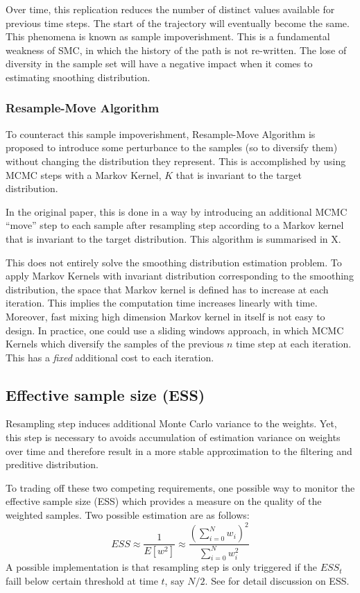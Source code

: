 Over time, this replication reduces the number of distinct values available for previous time steps. The start of the trajectory will eventually become the same. This phenomena is known as sample impoverishment. This is a fundamental weakness of SMC, in which the history of the path is not re-written. The lose of diversity in the sample set will have a negative impact when it comes to estimating snoothing distribution.

\subsubsection{Resample-Move Algorithm}
To counteract this sample impoverishment, Resample-Move Algorithm \cite{} is proposed to introduce some perturbance to the samples (so to diversify them) without changing the distribution they represent. This is accomplished by using MCMC steps with a Markov Kernel, $K$ that is invariant to the target distribution.

In the original paper, this is done in a way by introducing an additional MCMC ``move'' step to each sample after resampling step according to a Markov kernel that is invariant to the target distribution. This algorithm is summarised in X.

This does not entirely solve the smoothing distribution estimation problem. To apply Markov Kernels with invariant distribution corresponding to the smoothing distribution, the space that Markov kernel is defined has to increase at each iteration. This implies the computation time increases linearly with time. Moreover, fast mixing high dimension Markov kernel in itself is not easy to design. In practice, one could use a sliding windows approach, in which MCMC Kernels which diversify the samples of the previous $n$ time step at each iteration. This has a \emph{fixed} additional cost to each iteration.

\subsection{Effective sample size (ESS)}
Resampling step induces additional Monte Carlo variance to the weights. Yet, this step is necessary to avoids accumulation of estimation variance on weights over time and therefore result in a more stable approximation to the filtering and preditive distribution.

To trading off these two competing requirements, one possible way to monitor the effective sample size (ESS) which provides a measure on the quality of the weighted samples. Two possible estimation are as follows:
\begin{equation}
  ESS \approx \dfrac{1}{E[w^2]} \approx \dfrac{\left(\sum^N_{i=0} w_i \right)^2}{\sum^N_{i=0}w_i^2}
\end{equation}
A possible implementation is that resampling step is only triggered if the $ESS_t$ faill below certain threshold at time $t$, say $N/2$. See \cite{} for detail discussion on ESS.

